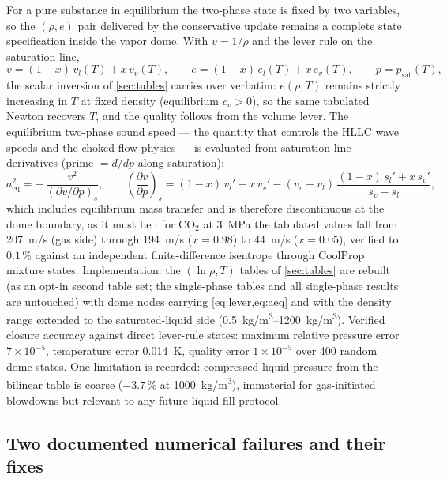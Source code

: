 \documentclass[11pt]{article}
\begin{document}
For a pure substance in equilibrium the two-phase state is fixed by
two variables, so the $(\rho, e)$ pair delivered by the conservative
update remains a complete state specification inside the vapor dome.
With $v = 1/\rho$ and the lever rule on the saturation line,
\begin{equation}
v = (1 - x)\,v_l(T) + x\,v_v(T),
\qquad
e = (1 - x)\,e_l(T) + x\,e_v(T),
\qquad
p = p_{\mathrm{sat}}(T),
\label{eq:lever}
\end{equation}
the scalar inversion of \cref{sec:tables} carries over verbatim:
$e(\rho, T)$ remains strictly increasing in $T$ at fixed density
(equilibrium $c_v > 0$), so the same tabulated Newton recovers $T$,
and the quality follows from the volume lever. The equilibrium
two-phase sound speed --- the quantity that controls the HLLC wave
speeds and the choked-flow physics --- is evaluated from
saturation-line derivatives (prime $= d/dp$ along saturation):
\begin{equation}
a_{\mathrm{eq}}^2 = -\,\frac{v^2}{(\partial v/\partial p)_s},
\qquad
\left(\frac{\partial v}{\partial p}\right)_{\!s}
 = (1-x)\,v_l' + x\,v_v'
 - (v_v - v_l)\,\frac{(1-x)\,s_l' + x\,s_v'}{s_v - s_l},
\label{eq:aeq}
\end{equation}
which includes equilibrium mass transfer and is therefore
discontinuous at the dome boundary, as it must be
\citep{lund2012}: for CO$_2$ at \SI{3}{MPa} the tabulated values fall
from \SI{207}{m/s} (gas side) through \SI{194}{m/s} ($x = 0.98$) to
\SI{44}{m/s} ($x = 0.05$), verified to $0.1\,\%$ against an
independent finite-difference isentrope through CoolProp mixture
states. Implementation: the $(\ln\rho, T)$ tables of \cref{sec:tables}
are rebuilt (as an opt-in second table set; the single-phase tables
and all single-phase results are untouched) with dome nodes carrying
\cref{eq:lever,eq:aeq} and with the density range extended to the
saturated-liquid side (\SIrange{0.5}{1200}{kg/m^3}). Verified
closure accuracy against direct lever-rule states: maximum relative
pressure error $7\times10^{-5}$, temperature error \SI{0.014}{K},
quality error $1\times10^{-5}$ over 400 random dome states. One
limitation is recorded: compressed-liquid pressure from the bilinear
table is coarse ($-3.7\,\%$ at \SI{1000}{kg/m^3}), immaterial for
gas-initiated blowdowns but relevant to any future liquid-fill
protocol.

\subsection{Two documented numerical failures and their fixes}
\end{document}
